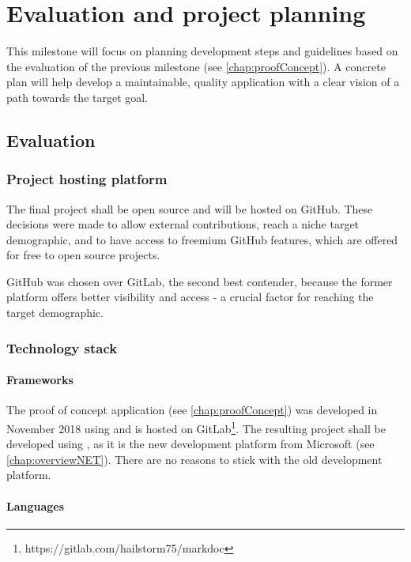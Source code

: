 \chapter{Evaluation and project planning} \label{chap:evalProjPlan}

This milestone will focus on planning development steps and guidelines based on the evaluation of the previous milestone (see \ref{chap:proofConcept}).
A concrete plan will help develop a maintainable, quality application with a clear vision of a path towards the target goal.

\section{Evaluation}

\subsection{Project hosting platform}

The final project shall be open source and will be hosted on GitHub.
These decisions were made to allow external contributions, reach a niche target demographic, and to have access to freemium GitHub features, which are offered for free to open source projects.

GitHub was chosen over GitLab, the second best contender, because the former platform offers better visibility and access - a crucial factor for reaching the target demographic.

\subsection{Technology stack}

\subsubsection{Frameworks}

The proof of concept application (see \ref{chap:proofConcept}) was developed in November 2018 using  and is hosted on GitLab\footnote{https://gitlab.com/hailstorm75/markdoc}. The resulting project shall be developed using , as it is the new development platform from Microsoft (see \ref{chap:overviewNET}). There are no reasons to stick with the old development platform.

\subsubsection{Languages}

